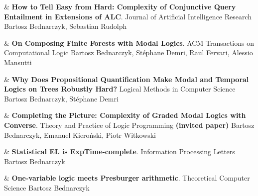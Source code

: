 \documentclass[10pt,a4paper]{article}
\begin{document}
\begin{EntriesTableYear}
  &
  \textbf{How to Tell Easy from Hard: Complexity of Conjunctive Query Entailment in Extensions of ALC}.
  \newline
  Journal of Artificial Intelligence Research 
  \newline
  Bartosz Bednarczyk, Sebastian Rudolph
  \\
\end{EntriesTableYear}

\begin{EntriesTableYear}
  &
  \textbf{On Composing Finite Forests with Modal Logics}.
  \newline
  ACM Transactions on Computational Logic
  \newline
  Bartosz Bednarczyk, Stéphane Demri, Raul Fervari, Alessio Mansutti
  \\
\end{EntriesTableYear}

\begin{EntriesTableYear}
  &
  \textbf{Why Does Propositional Quantification Make Modal and Temporal Logics on Trees Robustly Hard?}
  \newline
  Logical Methods in Computer Science
  \newline
 Bartosz Bednarczyk, Stéphane Demri
  \\
\end{EntriesTableYear}

\begin{EntriesTableYear}
  &
  \textbf{Completing the Picture: Complexity of Graded Modal Logics with Converse}.
  \newline
  Theory and Practice of Logic Programming \textbf{(invited paper)}
  \newline
 Bartosz Bednarczyk, Emanuel Kieroński, Piotr Witkowski
  \\
\end{EntriesTableYear}

\begin{EntriesTableYear}
  &
  \textbf{Statistical EL is ExpTime-complete}.
  \newline
  Information Processing Letters
  \newline
 Bartosz Bednarczyk
  \\
\end{EntriesTableYear}

\begin{EntriesTableYear}
  &
  \textbf{One-variable logic meets Presburger arithmetic}.
  \newline
  Theoretical Computer Science
  \newline
 Bartosz Bednarczyk
  \\
\end{EntriesTableYear}
\end{document}
